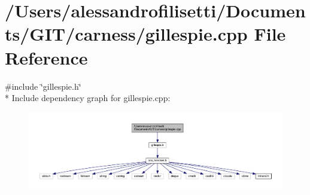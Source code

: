 \hypertarget{a00087}{\section{/\-Users/alessandrofilisetti/\-Documents/\-G\-I\-T/carness/gillespie.cpp File Reference}
\label{a00087}
}
{\ttfamily \#include \char`\"{}gillespie.\-h\char`\"{}}\\*
Include dependency graph for gillespie.\-cpp\-:\nopagebreak
\begin{figure}[H]
\begin{center}
\leavevmode
\includegraphics[width=350pt]{a00135}
\end{center}
\end{figure}
